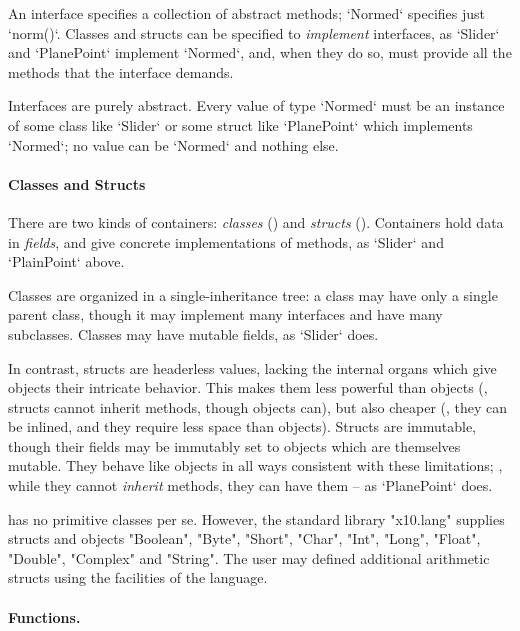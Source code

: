 An \Xten{} interface specifies a collection of abstract methods; \xcd`Normed`
specifies just \xcd`norm()`. Classes and
structs can be specified to {\em implement} interfaces, as \xcd`Slider` and
\xcd`PlanePoint` implement \xcd`Normed`, and, when they do so, must provide
all the methods that the interface demands.

Interfaces are
purely abstract. Every value of type \xcd`Normed` must be an instance of some
class like \xcd`Slider` or some struct like \xcd`PlanePoint` which implements
\xcd`Normed`; no value can be \xcd`Normed` and nothing else. 


\paragraph{Classes and Structs}



There are two kinds of containers: \emph{classes}
() and \emph{structs} (). Containers hold
data in {\em fields}, and give concrete implementations of 
methods, as \xcd`Slider` and \xcd`PlainPoint` above.

Classes are organized in a single-inheritance tree: a class may have only a
single parent class, though it may implement many interfaces and have many
subclasses. Classes may have mutable fields, as \xcd`Slider` does.

In contrast, structs are headerless values, lacking the internal organs
which give objects their intricate behavior.  This makes them less powerful
than objects (\eg, structs cannot inherit methods, though objects can), but also
cheaper (\eg, they can be inlined, and they require less space than objects).  
Structs are immutable, though their fields may be immutably set to objects
which are themselves mutable.  They behave like objects in all ways consistent
with these limitations; \eg, while they cannot {\em inherit} methods, they can
have them -- as \xcd`PlanePoint` does.

\Xten{} has no primitive classes per se. However, the standard library
\xcd"x10.lang" supplies structs and objects \xcd"Boolean", \xcd"Byte",
\xcd"Short", \xcd"Char", \xcd"Int", \xcd"Long", \xcd"Float", \xcd"Double",
\xcd"Complex" and \xcd"String". The user may defined additional arithmetic
structs using the facilities of the language.



\paragraph{Functions.}

